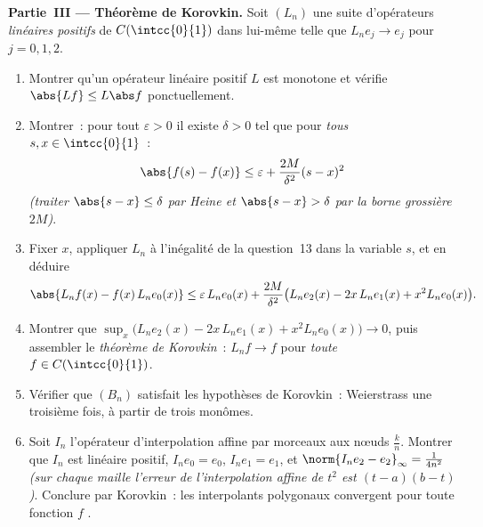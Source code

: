 \begin{problem}
\medskip
\noindent\textbf{Partie~III --- Théorème de Korovkin.} Soit $(L_n)$
une suite d'opérateurs \emph{linéaires positifs} de
$C(\intcc{0}{1})$ dans lui-même telle que $L_ne_j \to e_j$
 pour $j = 0, 1, 2$.
\begin{enumerate}[resume]
  \item Montrer qu'un opérateur linéaire positif $L$ est monotone et
        vérifie $\abs{Lf} \leq L\abs f$ ponctuellement.
  \item Montrer~: pour tout $\varepsilon > 0$ il existe $\delta > 0$
        tel que pour \emph{tous} $s, x \in \intcc{0}{1}$~:
        \[
        \abs{f(s) - f(x)} \leq \varepsilon +
        \frac{2M}{\delta^2}(s - x)^2
        \]
        \emph{(traiter $\abs{s - x} \leq \delta$ par Heine et
        $\abs{s-x} > \delta$ par la borne grossière $2M$)}.
  \item Fixer $x$, appliquer $L_n$ à l'inégalité de la question~13
        dans la variable $s$, et en déduire
        \[
        \abs{L_nf(x) - f(x)\,L_ne_0(x)}
        \leq \varepsilon\,L_ne_0(x) + \frac{2M}{\delta^2}
        \bigl(L_ne_2(x) - 2x\,L_ne_1(x) + x^2 L_ne_0(x)\bigr).
        \]
  \item Montrer que $\sup_x \bigl(L_ne_2(x) - 2x\,L_ne_1(x) + x^2
        L_ne_0(x)\bigr) \to 0$, puis assembler le
        \emph{théorème de Korovkin}~: $L_nf \to f$  pour
        \emph{toute} $f \in C(\intcc{0}{1})$.
  \item Vérifier que $(B_n)$ satisfait les hypothèses de Korovkin~:
        Weierstrass une troisième fois, à partir de trois monômes.
  \item Soit $I_n$ l'opérateur d'interpolation affine par morceaux
        aux nœuds $\frac kn$. Montrer que $I_n$ est
        linéaire positif, $I_ne_0 = e_0$, $I_ne_1 = e_1$, et
        $\norm{I_ne_2 - e_2}_\infty = \frac{1}{4n^2}$
        \emph{(sur chaque maille l'erreur de l'interpolation affine
        de $t^2$ est $(t - a)(b - t)$)}. Conclure par Korovkin~: les
        interpolants polygonaux convergent  pour toute
        fonction $f$ .
\end{enumerate}


\end{problem}
